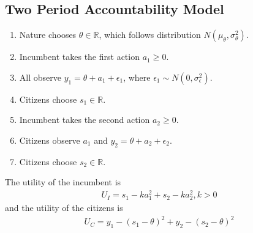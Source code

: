 \documentclass[11pt]{elegantbook}
\begin{document}
\subsection{Two Period Accountability Model}
\begin{enumerate}[1.]
    \item Nature chooses $\theta\in \mathbb{R}$, which follows distribution $N(\mu_\theta,\sigma_\theta^2)$.
    \item Incumbent takes the first action $a_1\geq 0$.
    \item All observe $y_1=\theta+a_1+\epsilon_1$, where $\epsilon_1\sim N(0,\sigma_\epsilon^2)$.
    \item Citizens choose $s_1\in \mathbb{R}$.
    \item Incumbent takes the second action $a_2\geq 0$.
    \item Citizens observe $a_1$ and $y_2=\theta+a_2+\epsilon_2$.
    \item Citizens choose $s_2\in \mathbb{R}$.
\end{enumerate}
The utility of the incumbent is
\begin{equation}
    \begin{aligned}
        U_I=s_1-k a_1^2+s_2-k a_2^2, k>0
    \end{aligned}
    \nonumber
\end{equation}
and the utility of the citizens is
\begin{equation}
    \begin{aligned}
        U_C=y_1-(s_1-\theta)^2+y_2-(s_2-\theta)^2
    \end{aligned}
    \nonumber
\end{equation}
\end{document}
